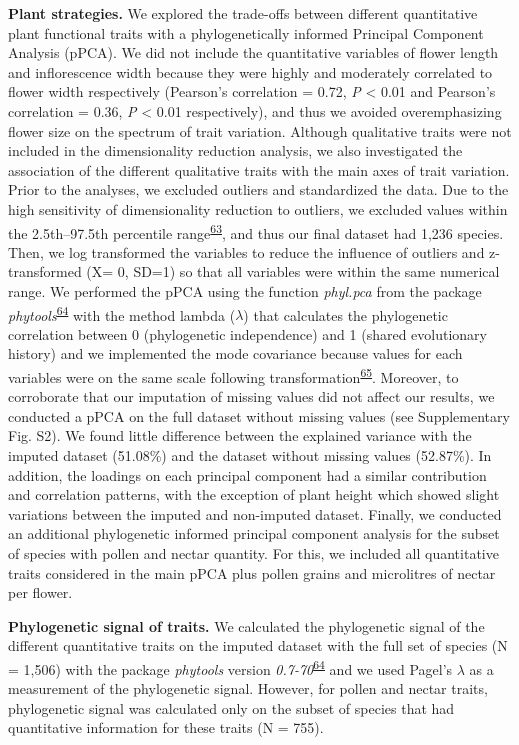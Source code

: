 \documentclass[12pt,a4paper,]{article}
\begin{document}
\textbf{Plant strategies.} We explored the trade-offs between different
quantitative plant functional traits with a phylogenetically informed
Principal Component Analysis (pPCA). We did not include the quantitative
variables of flower length and inflorescence width because they were
highly and moderately correlated to flower width respectively (Pearson's
correlation = 0.72, \emph{P} \textless{} 0.01 and Pearson's correlation
= 0.36, \emph{P} \textless{} 0.01 respectively), and thus we avoided
overemphasizing flower size on the spectrum of trait variation. Although
qualitative traits were not included in the dimensionality reduction
analysis, we also investigated the association of the different
qualitative traits with the main axes of trait variation. Prior to the
analyses, we excluded outliers and standardized the data. Due to the
high sensitivity of dimensionality reduction to outliers, we excluded
values within the 2.5th--97.5th percentile
range\textsuperscript{\protect\hyperlink{ref-legendre2012}{63}}, and
thus our final dataset had 1,236 species. Then, we log transformed the
variables to reduce the influence of outliers and z-transformed (X= 0,
SD=1) so that all variables were within the same numerical range. We
performed the pPCA using the function \emph{phyl.pca} from the package
\emph{phytools}\textsuperscript{\protect\hyperlink{ref-revell2012}{64}}
with the method lambda (\(\lambda\)) that calculates the phylogenetic
correlation between 0 (phylogenetic independence) and 1 (shared
evolutionary history) and we implemented the mode covariance because
values for each variables were on the same scale following
transformation\textsuperscript{\protect\hyperlink{ref-abdi2010}{65}}.
Moreover, to corroborate that our imputation of missing values did not
affect our results, we conducted a pPCA on the full dataset without
missing values (see Supplementary Fig. S2). We found little difference
between the explained variance with the imputed dataset (51.08\%) and
the dataset without missing values (52.87\%). In addition, the loadings
on each principal component had a similar contribution and correlation
patterns, with the exception of plant height which showed slight
variations between the imputed and non-imputed dataset. Finally, we
conducted an additional phylogenetic informed principal component
analysis for the subset of species with pollen and nectar quantity. For
this, we included all quantitative traits considered in the main pPCA
plus pollen grains and microlitres of nectar per flower.

\textbf{Phylogenetic signal of traits.} We calculated the phylogenetic
signal of the different quantitative traits on the imputed dataset with
the full set of species (N = 1,506) with the package \emph{phytools}
version
\emph{0.7-70}\textsuperscript{\protect\hyperlink{ref-revell2012}{64}}
and we used Pagel's \(\lambda\) as a measurement of the phylogenetic
signal. However, for pollen and nectar traits, phylogenetic signal was
calculated only on the subset of species that had quantitative
information for these traits (N = 755).
\end{document}
